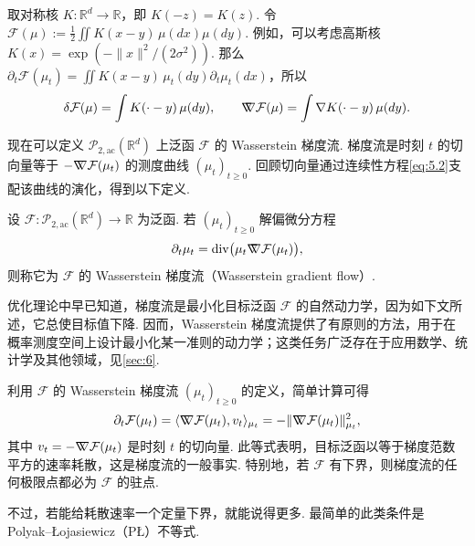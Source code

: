 \begin{example}[相互作用能]\label{ex:5.13}
取对称核 $K:\mathbb R^d\to\mathbb R$，即 $K(-z)=K(z)$. 令 $\mathcal F(\mu):=\frac12\iint K(x-y)\,\mu(dx)\mu(dy)$. 例如，可以考虑高斯核 $K(x)=\exp(-\|x\|^2/(2\sigma^2))$. 那么 $\partial_t\mathcal F(\mu_t)=\iint K(x-y)\,\mu_t(dy)\partial_t\mu_t(dx)$，所以
$$
\delta\mathcal F(\mu)=\int K(\cdot-y)\,\mu(dy),\qquad
\nabla\mkern-10mu\nabla\mathcal F(\mu)=\int\nabla K(\cdot-y)\,\mu(dy).
$$
\end{example}

现在可以定义 $\mathcal P_{2,\mathrm{ac}}(\mathbb R^d)$ 上泛函 $\mathcal F$ 的 Wasserstein 梯度流. 梯度流是时刻 $t$ 的切向量等于 $-\nabla\mkern-10mu\nabla\mathcal F(\mu_t)$ 的测度曲线 $(\mu_t)_{t\geq0}$. 回顾切向量通过连续性方程\eqref{eq:5.2}支配该曲线的演化，得到以下定义.

\begin{definition}\label{def:5.14}
设 $\mathcal F:\mathcal P_{2,\mathrm{ac}}(\mathbb R^d)\to\mathbb R$ 为泛函. 若 $(\mu_t)_{t\geq0}$ 解偏微分方程
$$
\partial_t\mu_t=\operatorname{div}\bigl(\mu_t\nabla\mkern-10mu\nabla\mathcal F(\mu_t)\bigr),
$$
则称它为 $\mathcal F$ 的 Wasserstein 梯度流（Wasserstein gradient flow）.
\end{definition}

优化理论中早已知道，梯度流是最小化目标泛函 $\mathcal F$ 的自然动力学，因为如下文所述，它总使目标值下降. 因而，Wasserstein 梯度流提供了有原则的方法，用于在概率测度空间上设计最小化某一准则的动力学；这类任务广泛存在于应用数学、统计学及其他领域，见\autoref{sec:6}.

利用 $\mathcal F$ 的 Wasserstein 梯度流 $(\mu_t)_{t\geq0}$ 的定义，简单计算可得
\begin{equation}\label{eq:5.10}
\partial_t\mathcal F(\mu_t)
=\langle\nabla\mkern-10mu\nabla\mathcal F(\mu_t),v_t\rangle_{\mu_t}
=-\|\nabla\mkern-10mu\nabla\mathcal F(\mu_t)\|_{\mu_t}^2,
\end{equation}
其中 $v_t=-\nabla\mkern-10mu\nabla\mathcal F(\mu_t)$ 是时刻 $t$ 的切向量. 此等式表明，目标泛函以等于梯度范数平方的速率耗散，这是梯度流的一般事实. 特别地，若 $\mathcal F$ 有下界，则梯度流的任何极限点都必为 $\mathcal F$ 的驻点.

不过，若能给耗散速率一个定量下界，就能说得更多. 最简单的此类条件是 Polyak--Łojasiewicz（PŁ）不等式.

